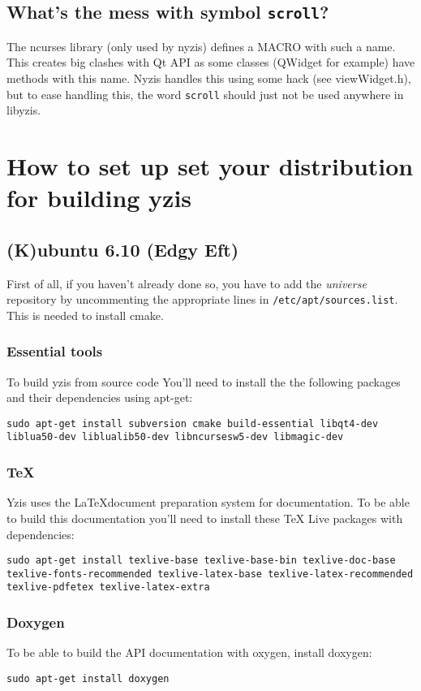 \documentclass[a4paper,12pt]{report}
\begin{document}
\section{What's the mess with symbol \texttt{scroll}?}

The ncurses library (only used by nyzis) defines a MACRO with such a name.
This creates big clashes with Qt API as some classes (QWidget for example)
have methods with this name. Nyzis handles this using some hack (see
viewWidget.h), but to ease handling this, the word \verb+scroll+ should
just not be used anywhere in libyzis.

\appendix

\chapter{How to set up set your distribution for building yzis}

\section{(K)ubuntu 6.10 (Edgy Eft)}

First of all, if you haven't already done so, you have to add the
\emph{universe} repository by uncommenting the appropriate lines in
\texttt{/etc/apt/sources.list}. This is needed to install cmake.

\subsection{Essential tools}
To build yzis from source code You'll need to install the the following packages
and their dependencies using apt-get:

\texttt{sudo apt-get install subversion cmake build-essential libqt4-dev liblua50-dev
liblualib50-dev libncursesw5-dev libmagic-dev}

\subsection{\TeX}

Yzis uses the \LaTeX document preparation system for documentation. To be able
to build this documentation you'll need to install these \TeX{} Live packages
with dependencies:

\texttt{sudo apt-get install texlive-base texlive-base-bin texlive-doc-base
texlive-fonts-recommended texlive-latex-base texlive-latex-recommended
texlive-pdfetex texlive-latex-extra}

\subsection{Doxygen}
To be able to build the API documentation with oxygen, install doxygen:

\texttt{sudo apt-get install doxygen}
\end{document}
